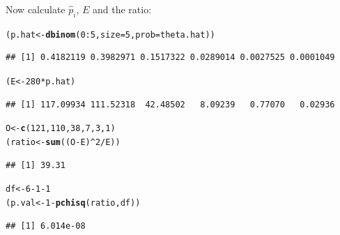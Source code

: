 \documentclass{article}\usepackage{graphicx, color}
\makeatletter
\newcommand{\hlfunctioncall}[1]{\textcolor[rgb]{0.501960784313725,0,0.329411764705882}{\textbf{#1}}}%
\newenvironment{kframe}{%
 \def\at@end@of@kframe{}%
 \ifinner\ifhmode%
  \def\at@end@of@kframe{\end{minipage}}%
  \begin{minipage}{\columnwidth}%
 \fi\fi%
 \def\FrameCommand##1{\hskip\@totalleftmargin \hskip-\fboxsep
 \colorbox{shadecolor}{##1}\hskip-\fboxsep
     \hskip-\linewidth \hskip-\@totalleftmargin \hskip\columnwidth}%
 \MakeFramed {\advance\hsize-\width
   \@totalleftmargin\z@ \linewidth\hsize
   \@setminipage}}%
 {\par\unskip\endMakeFramed%
 \at@end@of@kframe}
\newenvironment{knitrout}{}{} %
\makeatother
\begin{document}
\begin{enumerate}
\begin{shaded}
Now calculate $\hat{p}_i$, $E$ and the ratio:
\begin{knitrout}
\color{fgcolor}\begin{kframe}
\begin{alltt}
(p.hat <- \hlfunctioncall{dbinom}(0:5, size = 5, prob = theta.hat))
\end{alltt}
\begin{verbatim}
## [1] 0.4182119 0.3982971 0.1517322 0.0289014 0.0027525 0.0001049
\end{verbatim}
\begin{alltt}
(E <- 280 * p.hat)
\end{alltt}
\begin{verbatim}
## [1] 117.09934 111.52318  42.48502   8.09239   0.77070   0.02936
\end{verbatim}
\begin{alltt}
O <- \hlfunctioncall{c}(121, 110, 38, 7, 3, 1)
(ratio <- \hlfunctioncall{sum}((O - E)^2/E))
\end{alltt}
\begin{verbatim}
## [1] 39.31
\end{verbatim}
\begin{alltt}
df <- 6 - 1 - 1
(p.val <- 1 - \hlfunctioncall{pchisq}(ratio, df))
\end{alltt}
\begin{verbatim}
## [1] 6.014e-08
\end{verbatim}
\end{kframe}
\end{knitrout}


\end{shaded}
\end{enumerate}
\end{document}
